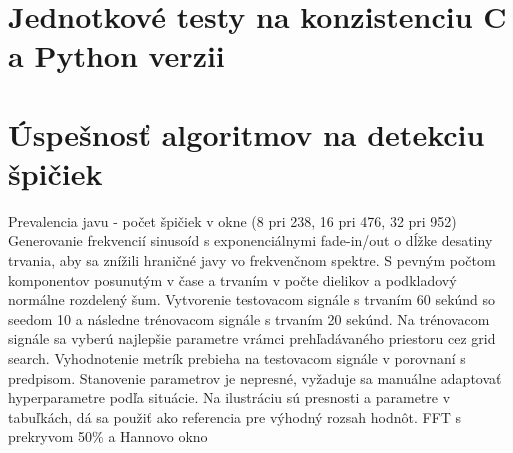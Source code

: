 \section{Jednotkové testy na konzistenciu C a Python verzii}


\section{Úspešnosť algoritmov na detekciu špičiek}

Prevalencia javu - počet špičiek v okne (8 pri 238, 16 pri 476, 32 pri 952) 
Generovanie frekvencií sinusoíd s exponenciálnymi fade-in/out o dĺžke desatiny trvania, aby sa znížili hraničné javy vo frekvenčnom spektre. S pevným počtom komponentov posunutým v čase a trvaním v počte dielikov a podkladový normálne rozdelený šum.
Vytvorenie testovacom signále s trvaním 60 sekúnd
so seedom 10 a následne trénovacom signále s trvaním 20 sekúnd. Na trénovacom signále sa vyberú najlepšie parametre
vrámci prehľadávaného priestoru cez grid search. Vyhodnotenie metrík prebieha na testovacom signále v porovnaní s predpisom.
Stanovenie parametrov je nepresné, vyžaduje sa manuálne adaptovať hyperparametre podľa situácie. Na ilustráciu
sú presnosti a parametre v tabuľkách, dá sa použiť ako referencia pre výhodný rozsah hodnôt. FFT s prekryvom 50\% a Hannovo okno

